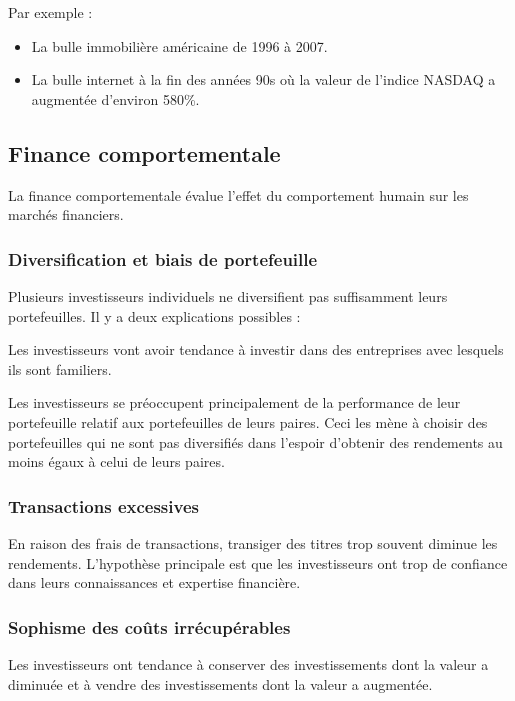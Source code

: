 \documentclass[10pt, french]{article}
\begin{document}
\begin{multicols*}{2}
Par exemple : 
\begin{itemize}
	\item	La bulle immobilière américaine de 1996 à 2007.
	\item	La bulle internet à la fin des années 90s où la valeur de l'indice NASDAQ a augmentée d'environ 580\%.
\end{itemize}


\columnbreak
\subsection{Finance comportementale}
La finance comportementale évalue l'effet du comportement humain sur les marchés financiers.

\subsubsection{Diversification et biais de portefeuille}
Plusieurs investisseurs individuels ne diversifient pas suffisamment leurs portefeuilles. Il y a deux explications possibles : 

\begin{definitionNOHFILLprop}
Les investisseurs vont avoir tendance à investir dans des entreprises avec lesquels ils sont familiers.
\end{definitionNOHFILLprop}

\begin{definitionNOHFILLprop}
Les investisseurs se préoccupent principalement de la performance de leur portefeuille relatif aux portefeuilles de leurs paires. Ceci les mène à choisir des portefeuilles qui ne sont pas diversifiés dans l'espoir d'obtenir des rendements au moins égaux à celui de leurs paires.\end{definitionNOHFILLprop}


\subsubsection{Transactions excessives}
En raison des frais de transactions, transiger des titres trop souvent diminue les rendements. L'hypothèse principale est que les investisseurs ont trop de confiance dans leurs connaissances et expertise financière.


\subsubsection{Sophisme des coûts irrécupérables}
Les investisseurs ont tendance à conserver des investissements dont la valeur a diminuée et à vendre des investissements dont la valeur a augmentée.



\end{multicols*}
\end{document}

